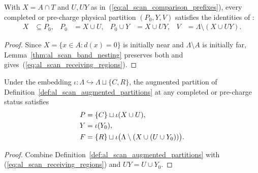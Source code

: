 \begin{lemma}
    \label{thm:al_scan_receiving_regions}
    \leanok
    With $X=A\cap T$ and $U,UY$ as in~(\ref{eq:al_scan_comparison_prefixes}),
    every completed or pre-charge physical partition $(P_0,Y,V)$ satisfies the
    identities of \cite[Section~9]{OpenAI2026AreaLaw}:
    \begin{align}
        X         & \subseteq P_0,               &
        P_0       & =X\cup U,                    &
        P_0\cup Y & =X\cup UY,                   &
        V         & =\Lambda\setminus(X\cup UY).
        \label{eq:al_scan_receiving_regions}
    \end{align}
\end{lemma}
\begin{proof}\leanok
    Since $X=\{x\in A:d(x)=0\}$ is initially near and $\Lambda\setminus A$ is
    initially far, Lemma~\ref{thm:al_scan_band_nesting} preserves both and
    gives~(\ref{eq:al_scan_receiving_regions}).
\end{proof}

\begin{lemma}
    \label{thm:al_scan_augmented_receiving_regions}
    \leanok
    Under the embedding $\iota:\Lambda\hookrightarrow\Lambda\sqcup\{C,R\}$, the
    augmented partition of Definition~\ref{def:al_scan_augmented_partitions} at
    any completed or pre-charge status satisfies
    \begin{align}
        P & = \{C\}\sqcup\iota(X\cup U),
        \label{eq:al_scan_augmented_near}                                     \\
        Y & = \iota(Y_0), \notag                                              \\
        F & = \{R\}\sqcup\iota\bigl(\Lambda\setminus(X\cup(U\cup Y_0))\bigr).
        \label{eq:al_scan_augmented_far}
    \end{align}
\end{lemma}
\begin{proof}\leanok
    Combine Definition~\ref{def:al_scan_augmented_partitions} with
    (\ref{eq:al_scan_receiving_regions}) and $UY=U\cup Y_0$.
\end{proof}

